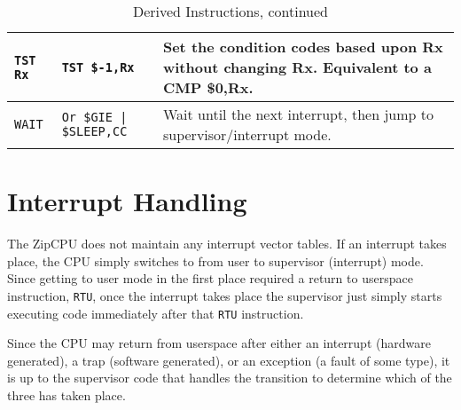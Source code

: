 \documentclass{gqtekspec}
\begin{document}
\begin{table}\begin{center}
\begin{tabular}{p{1.0in}p{1.5in}p{3in}}\\\hline
{\tt TST Rx}
	& {\tt TST \$-1,Rx}
	& Set the condition codes based upon Rx without changing Rx.
	Equivalent to a CMP \$0,Rx.\\\hline
{\tt WAIT}
	& {\tt Or \$GIE | \$SLEEP,CC}
	& Wait until the next interrupt, then jump to supervisor/interrupt
	mode.
\end{tabular}
\caption{Derived Instructions, continued}\label{tbl:derived-4}
\end{center}\end{table}

\section{Interrupt Handling}
The ZipCPU does not maintain any interrupt vector tables.  If an interrupt
takes place, the CPU simply switches to from user to supervisor (interrupt)
mode.  Since getting to user mode in the first place required a return to
userspace instruction, {\tt RTU}, once the interrupt takes place the 
supervisor just simply starts executing code immediately after that
{\tt RTU} instruction.

Since the CPU may return from userspace after either an interrupt (hardware
generated), a trap (software generated), or an exception (a fault of some
type), it is up to the supervisor code that handles the transition to
determine which of the three has taken place.
\end{document}
